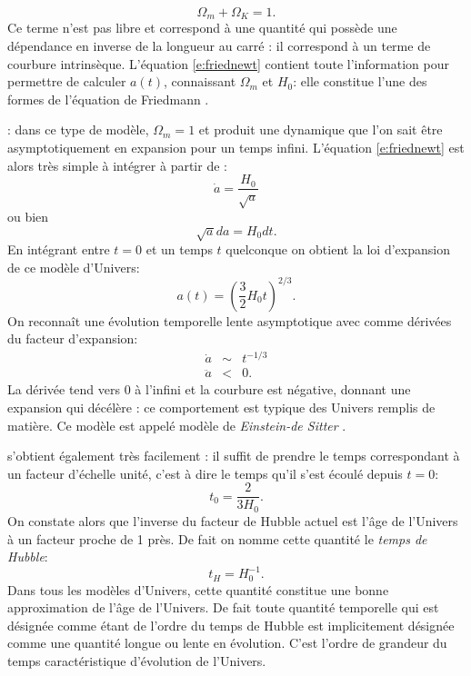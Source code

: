 \begin{equation}
\Omega_m+\Omega_K=1.
\end{equation}
Ce terme n'est pas libre et correspond à une quantité qui possède une dépendance en inverse de la longueur au carré : il correspond à un terme de courbure intrinsèque. L'équation \ref{e:friednewt} contient toute l'information pour permettre de calculer $a(t)$, connaissant $\Omega_m$ et $H_0$: elle constitue l'une des formes de l'équation de Friedmann .

: dans ce type de modèle, $\Omega_m=1$ et produit une dynamique que l'on sait être asymptotiquement en expansion pour un temps infini. L'équation \ref{e:friednewt} est alors très simple à intégrer à partir de :
\begin{equation}
\dot a=\frac{H_0}{\sqrt{a}}
\end{equation}
ou bien
\begin{equation}
\sqrt{a}da=H_0 dt.
\end{equation}
En intégrant entre $t=0$ et un temps $t$ quelconque on obtient la loi d'expansion de ce modèle d'Univers:
\begin{equation}
a(t)=\left(\frac{3}{2}H_0 t\right)^{2/3}.
\end{equation}
On reconnaît une évolution temporelle lente asymptotique avec comme dérivées du facteur d'expansion:
\begin{eqnarray}
\dot a &\sim& t^{-1/3}\\
\ddot a &<&0.
\end{eqnarray}
La dérivée tend vers 0 à l'infini et la courbure est négative, donnant une expansion qui décélère : ce comportement est typique des Univers remplis de matière. Ce modèle est appelé modèle de \textit{Einstein-de Sitter} .

 s'obtient également très facilement : il suffit de prendre le temps correspondant à un facteur d'échelle unité, c'est à dire le temps qu'il s'est écoulé depuis $t=0$:
\begin{equation}
t_0=\frac{2}{3H_0}.
\end{equation}
On constate alors que l'inverse du facteur de Hubble actuel est l'âge de l'Univers à un facteur proche de 1 près. De fait on nomme cette quantité le \textit{temps de Hubble}:
\begin{equation}
t_H=H_0^{-1}.
\end{equation} 
Dans tous les modèles d'Univers, cette quantité constitue une bonne approximation de l'âge de l'Univers. De fait toute quantité temporelle qui est désignée comme étant de l'ordre du temps de Hubble  est implicitement désignée comme une quantité longue ou lente en évolution. C'est l'ordre de grandeur du temps caractéristique d'évolution de l'Univers.

